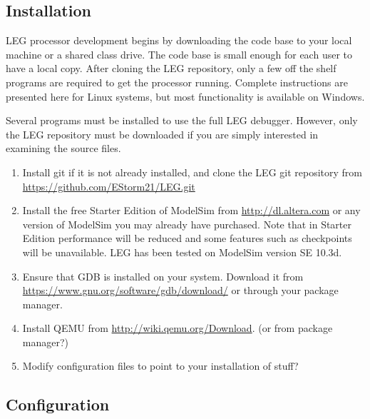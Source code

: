 \subsection{Installation}
LEG processor development begins by downloading the code base to your local machine or a shared class drive.
The code base is small enough for each user to have a local copy.
After cloning the LEG repository, only a few off the shelf programs are required to get the processor running.
Complete instructions are presented here for Linux systems, but most functionality is available on Windows.

Several programs must be installed to use the full LEG debugger. 
However, only the LEG repository must be downloaded if you are simply interested in examining the source files.

\begin{enumerate}
\item Install git if it is not already installed, and clone the LEG git repository from \url{https://github.com/EStorm21/LEG.git}
\item Install the free Starter Edition of ModelSim from \url{http://dl.altera.com} or any version of ModelSim you may already have purchased. Note that in Starter Edition performance will be reduced and some features such as checkpoints will be unavailable. LEG has been tested on ModelSim version SE 10.3d. 
\item Ensure that GDB is installed on your system. Download it from \url{https://www.gnu.org/software/gdb/download/} or through your package manager.
\item Install QEMU from \url{http://wiki.qemu.org/Download}. (or from package manager?)
\item Modify configuration files to point to your installation of stuff?
\end{enumerate}

\subsection{Configuration}
